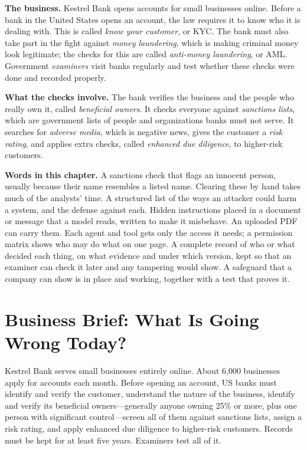 \begin{beforeyoustart}
\textbf{The business.} Kestrel Bank opens accounts for small businesses online. Before a bank in the United States opens an account, the law requires it to know who it is dealing with. This is called \emph{know your customer}, or KYC. The bank must also take part in the fight against \emph{money laundering}, which is making criminal money look legitimate; the checks for this are called \emph{anti-money laundering}, or AML. Government \emph{examiners} visit banks regularly and test whether these checks were done and recorded properly.

\textbf{What the checks involve.} The bank verifies the business and the people who really own it, called \emph{beneficial owners}. It checks everyone against \emph{sanctions lists}, which are government lists of people and organizations banks must not serve. It searches for \emph{adverse media}, which is negative news, gives the customer a \emph{risk rating}, and applies extra checks, called \emph{enhanced due diligence}, to higher-risk customers.

\textbf{Words in this chapter.}
 A sanctions check that flags an innocent person, usually because their name resembles a listed name. Clearing these by hand takes much of the analysts' time.
 A structured list of the ways an attacker could harm a system, and the defense against each.
 Hidden instructions placed in a document or message that a model reads, written to make it misbehave. An uploaded PDF can carry them.
 Each agent and tool gets only the access it needs; a permission matrix shows who may do what on one page.
 A complete record of who or what decided each thing, on what evidence and under which version, kept so that an examiner can check it later and any tampering would show.
 A safeguard that a company can show is in place and working, together with a test that proves it.
\end{beforeyoustart}


\section{Business Brief: What Is Going Wrong Today?}
\label{sec:kyc-brief}

Kestrel Bank serves small businesses entirely online. About 6{,}000 businesses apply for accounts each month. Before opening an account, US banks must identify and verify the customer, understand the nature of the business, identify and verify its beneficial owners---generally anyone owning 25\% or more, plus one person with significant control---screen all of them against sanctions lists, assign a risk rating, and apply enhanced due diligence to higher-risk customers. Records must be kept for at least five years. Examiners test all of it.

